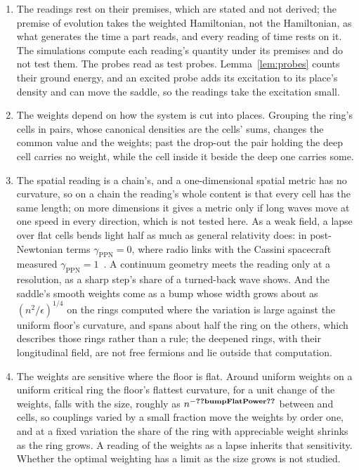 \documentclass[aps,prd,reprint,superscriptaddress]{revtex4-2}
\begin{document}
\begin{enumerate}
\item The readings rest on their premises, which are stated and not derived; the premise of evolution takes the weighted Hamiltonian, not the Hamiltonian, as what generates the time a part reads, and every reading of time rests on it. The simulations compute each reading's quantity under its premises and do not test them. The probes read as test probes. Lemma~\ref{lem:probes} counts their ground energy, and an excited probe adds its excitation to its place's density and can move the saddle, so the readings take the excitation small.
\item The weights depend on how the system is cut into places. Grouping the ring's cells in pairs, whose canonical densities are the cells' sums, changes the common value and the weights; past the drop-out the pair holding the deep cell carries no weight, while the cell inside it beside the deep one carries some.
\item The spatial reading is a chain's, and a one-dimensional spatial metric has no curvature, so on a chain the reading's whole content is that every cell has the same length; on more dimensions it gives a metric only if long waves move at one speed in every direction, which is not tested here. As a weak field, a lapse over flat cells bends light half as much as general relativity does: in post-Newtonian terms $\gamma_{\mathrm{PPN}} = 0$, where radio links with the Cassini spacecraft measured $\gamma_{\mathrm{PPN}} = 1$~\cite{BertottiIessTortora2003}. A continuum geometry meets the reading only at a resolution, as a sharp step's share of a turned-back wave shows. And the saddle's smooth weights come as a bump whose width grows about as $(n^2/\epsilon)^{1/4}$ on the  rings computed where the variation is large against the uniform floor's curvature, and spans about half the ring on the others, which describes those rings rather than a rule; the deepened rings, with their longitudinal field, are not free fermions and lie outside that computation.
\item The weights are sensitive where the floor is flat. Around uniform weights on a uniform critical ring the floor's flattest curvature, for a unit change of the weights, falls with the size, roughly as $n^{-\val{bumpFlatPower}}$ between  and  cells, so couplings varied by a small fraction move the weights by order one, and at a fixed variation the share of the ring with appreciable weight shrinks as the ring grows. A reading of the weights as a lapse inherits that sensitivity. Whether the optimal weighting has a limit as the size grows is not studied.

\end{enumerate}
\end{document}
